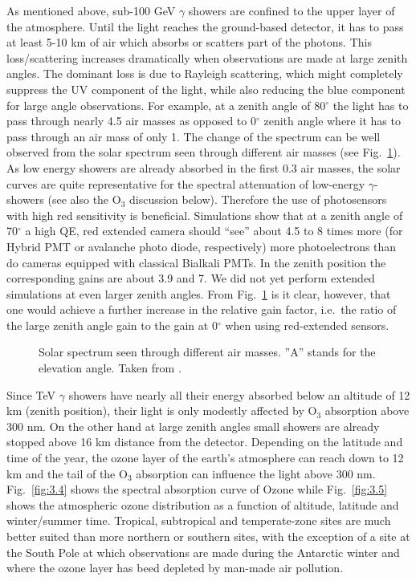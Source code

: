 \par\medskip As mentioned above, sub-100 GeV $\gamma$ showers are confined to the 
upper layer of the atmosphere. 
Until the \Cerenkov light reaches the ground-based detector, 
it has to pass at least 5-10 km of 
air which absorbs or scatters part of the photons. This 
loss/scattering increases dramatically 
when observations are made at large zenith angles. The dominant 
loss is due to Rayleigh scattering, which might 
completely suppress the UV component of the \Cerenkov light,
while also reducing the blue 
component for large angle observations. For example, at
a zenith angle of 80$^\circ$ the light has to pass 
through nearly 4.5 air masses
as opposed to 0$^\circ$ zenith angle where
it has to pass through an air mass of only 1. The change of the spectrum
can be well observed from the 
solar spectrum seen through different air masses (see 
Fig.~\ref{fig:3.3}). As low energy showers are 
already absorbed in the first 0.3 air masses, the solar 
curves are quite representative for the spectral 
attenuation of low-energy $\gamma$-showers (see also the O$_3$ 
discussion below). Therefore the use of 
photosensors with high red sensitivity is beneficial.
Simulations show that at a zenith angle of 70$^\circ$ 
a high QE, red extended camera should 
``see'' about 4.5 to 8 times more (for Hybrid PMT or avalanche photo diode,
respectively) more photoelectrons than do cameras equipped with
classical Bialkali PMTs.
In the zenith position the corresponding gains are about 3.9 and 7. 
We did not yet perform extended simulations at even larger
zenith angles. From Fig.~\ref{fig:3.3}
is it clear, however, that one would
achieve a further increase in the
relative gain factor, i.e.\ the
ratio of the large zenith
angle gain to the gain at 0$^\circ$ when using red-extended sensors.

\begin{figure}[htb]
\epsfxsize=12cm
\caption{\label{fig:3.3}
Solar spectrum seen through different air masses. 
''A'' stands for the elevation angle. Taken
from \cite{winter:91}.}
\end{figure}

Since TeV $\gamma$ showers have nearly all their energy absorbed below
an altitude of 12 km (zenith position), 
their \Cerenkov light is only modestly affected by O$_3$ 
absorption above 300 nm. On the other hand 
at large zenith angles small showers are already 
stopped above 16 km distance from the detector. Depending on 
the latitude and time of the year, the 
ozone layer of the earth's atmosphere can reach down to 12 km 
and the tail of the O$_3$ absorption can influence the 
\Cerenkov light above 300 nm. Fig.~\ref{fig:3.4} 
shows the spectral absorption curve of Ozone \cite{driscoll:78} while
Fig.~\ref{fig:3.5} \cite{driscoll:78} shows the 
atmospheric ozone distribution as a function of altitude,
latitude and winter/summer time. 
Tropical, subtropical and temperate-zone sites are much better
suited than more 
northern or southern sites, with the exception of a site at
the South Pole at which observations are made during the Antarctic winter
and where the ozone layer has beed depleted by man-made air pollution.


